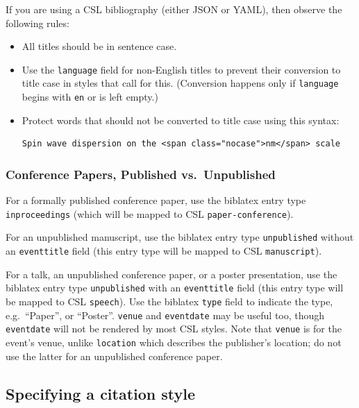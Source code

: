 \documentclass[
]{article}
\begin{document}
If you are using a CSL bibliography (either JSON or YAML), then observe
the following rules:

\begin{itemize}
\item
  All titles should be in sentence case.
\item
  Use the \texttt{language} field for non-English titles to prevent
  their conversion to title case in styles that call for this.
  (Conversion happens only if \texttt{language} begins with \texttt{en}
  or is left empty.)
\item
  Protect words that should not be converted to title case using this
  syntax:

\begin{verbatim}
Spin wave dispersion on the <span class="nocase">nm</span> scale
\end{verbatim}
\end{itemize}

\hypertarget{conference-papers-published-vs.-unpublished}{%
\subsubsection{Conference Papers, Published
vs.~Unpublished}\label{conference-papers-published-vs.-unpublished}}

For a formally published conference paper, use the biblatex entry type
\texttt{inproceedings} (which will be mapped to CSL
\texttt{paper-conference}).

For an unpublished manuscript, use the biblatex entry type
\texttt{unpublished} without an \texttt{eventtitle} field (this entry
type will be mapped to CSL \texttt{manuscript}).

For a talk, an unpublished conference paper, or a poster presentation,
use the biblatex entry type \texttt{unpublished} with an
\texttt{eventtitle} field (this entry type will be mapped to CSL
\texttt{speech}). Use the biblatex \texttt{type} field to indicate the
type, e.g.~``Paper'', or ``Poster''. \texttt{venue} and
\texttt{eventdate} may be useful too, though \texttt{eventdate} will not
be rendered by most CSL styles. Note that \texttt{venue} is for the
event's venue, unlike \texttt{location} which describes the publisher's
location; do not use the latter for an unpublished conference paper.

\hypertarget{specifying-a-citation-style}{%
\subsection{Specifying a citation
style}\label{specifying-a-citation-style}}
\end{document}
